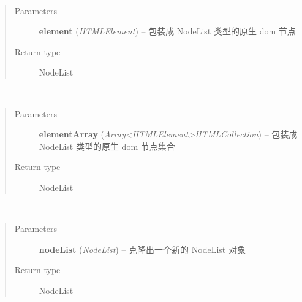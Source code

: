 \documentclass[letterpaper,10pt,english]{sphinxmanual}
\begin{document}

\begin{fulllineitems}
~\begin{quote}\begin{description}
\item[{Parameters}] \leavevmode
\textbf{element} (\emph{HTMLElement}) -- 包装成 NodeList 类型的原生 dom 节点

\item[{Return type}] \leavevmode
NodeList

\end{description}\end{quote}

\end{fulllineitems}



\begin{fulllineitems}
~\begin{quote}\begin{description}
\item[{Parameters}] \leavevmode
\textbf{elementArray} (\emph{Array\textless{}HTMLElement\textgreater{}\textbar{}HTMLCollection}) -- 包装成 NodeList 类型的原生 dom 节点集合

\item[{Return type}] \leavevmode
NodeList

\end{description}\end{quote}

\end{fulllineitems}



\begin{fulllineitems}
~\begin{quote}\begin{description}
\item[{Parameters}] \leavevmode
\textbf{nodeList} (\emph{NodeList}) -- 克隆出一个新的 NodeList 对象

\item[{Return type}] \leavevmode
NodeList

\end{description}\end{quote}

\end{fulllineitems}
\end{document}
